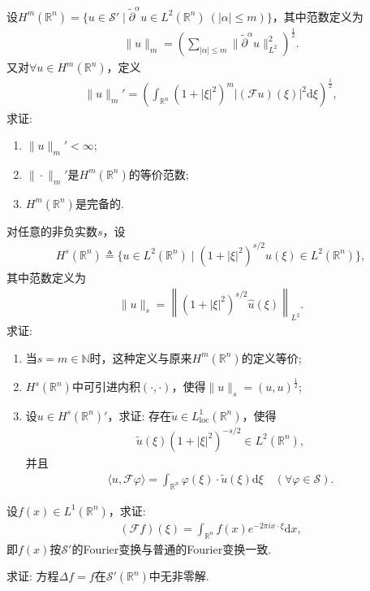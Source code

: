\documentclass[../../main.tex]{subfiles}%
\begin{document}
\begin{example}
设$H^m(\mathbb{R}^n) = \{u \in \mathscr{S}' \mid \widetilde{\partial}^\alpha u \in L^2(\mathbb{R}^n)\ (|\alpha| \leqslant m)\}$，其中范数定义为
\begin{align*}
\|u\|_m = \left(\sum\limits_{|\alpha|\leqslant m}\|\widetilde{\partial}^\alpha u\|_{L^2}^2\right)^{\frac12}.
\end{align*}
又对$\forall u \in H^m(\mathbb{R}^n)$，定义
\begin{align*}
\|u\|_m' = \left(\int_{\mathbb{R}^n}(1+|\xi|^2)^m|(\mathscr{F}u)(\xi)|^2\mathrm{d}\xi\right)^{\frac12},
\end{align*}
求证:
\begin{enumerate}[(1)]
\item $\|u\|_m' < \infty$;
\item $\|\cdot\|_m'$是$H^m(\mathbb{R}^n)$的等价范数;
\item $H^m(\mathbb{R}^n)$是完备的.
\end{enumerate}
\end{example}

\begin{example}
对任意的非负实数$s$，设
\begin{align*}
H^s(\mathbb{R}^n) \triangleq \{u \in L^2(\mathbb{R}^n) \mid (1+|\xi|^2)^{s/2}\widehat{u}(\xi) \in L^2(\mathbb{R}^n)\},
\end{align*}
其中范数定义为
\begin{align*}
\|u\|_s = \left\|(1+|\xi|^2)^{s/2}\widehat{u}(\xi)\right\|_{L^2}.
\end{align*}
求证:
\begin{enumerate}[(1)]
\item 当$s = m \in \mathbb{N}$时，这种定义与原来$H^m(\mathbb{R}^n)$的定义等价;
\item $H^s(\mathbb{R}^n)$中可引进内积$(\cdot,\cdot)$，使得$\|u\|_s = (u,u)^{\frac12}$;
\item 设$u \in H^s(\mathbb{R}^n)'$，求证: 存在$\widetilde{u} \in L^1_{\mathrm{loc}}(\mathbb{R}^n)$，使得
\begin{align*}
\widetilde{u}(\xi)(1+|\xi|^2)^{-s/2} \in L^2(\mathbb{R}^n),
\end{align*}
并且
\begin{align*}
\langle u,\mathscr{F}\varphi\rangle = \int_{\mathbb{R}^n}\varphi(\xi)\cdot\widetilde{u}(\xi)\mathrm{d}\xi \quad (\forall \varphi \in \mathscr{S}).
\end{align*}
\end{enumerate}
\end{example}

\begin{example}
设$f(x) \in L^1(\mathbb{R}^n)$，求证:
\begin{align*}
(\mathscr{F}f)(\xi) = \int_{\mathbb{R}^n}f(x)e^{-2\pi i x\cdot\xi}\mathrm{d}x,
\end{align*}
即$f(x)$按$\mathscr{S}'$的Fourier变换与普通的Fourier变换一致.
\end{example}

\begin{example}
求证: 方程$\Delta f = f$在$\mathscr{S}'(\mathbb{R}^n)$中无非零解.
\end{example}
\end{document}
